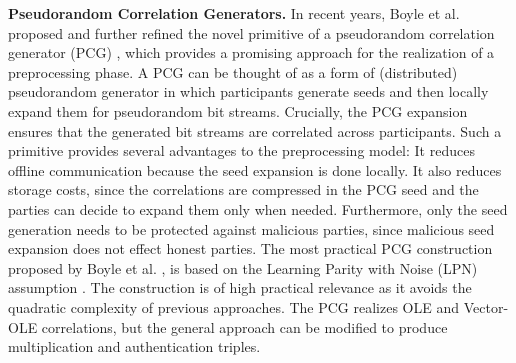 \textbf{Pseudorandom Correlation Generators.} In recent years, Boyle et al. proposed and further refined the novel primitive of a pseudorandom correlation generator (PCG) \cite{boyle2015function, boyle2016function, boyle2020efficient}, which provides a promising approach for the realization of a preprocessing phase. A PCG can be thought of as a form of (distributed) pseudorandom generator in which participants generate seeds and then locally expand them for pseudorandom bit streams. Crucially, the PCG expansion ensures that the generated bit streams are correlated across participants. Such a primitive provides several advantages to the preprocessing model: It reduces offline communication because the seed expansion is done locally. It also reduces storage costs, since the correlations are compressed in the PCG seed and the parties can decide to expand them only when needed. Furthermore, only the seed generation needs to be protected against malicious parties, since malicious seed expansion does not effect honest parties. The most practical PCG construction proposed by Boyle et al. \cite{boyle2020efficient}, is based on the Learning Parity with Noise (LPN) assumption \cite{pietrzak2012cryptography}. The construction is of high practical relevance as it avoids the quadratic complexity of previous approaches. The PCG realizes OLE and Vector-OLE correlations, but the general approach can be modified to produce multiplication and authentication triples.
\\\\
